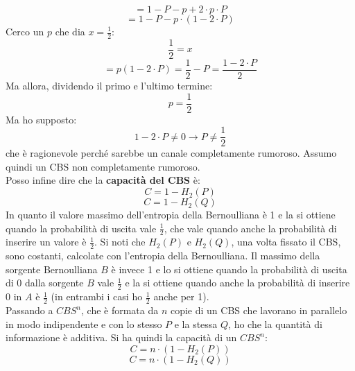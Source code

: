 \documentclass[a4paper,12pt, oneside]{book}
\begin{document}
\[=1-P-p+2\cdot p\cdot P\]
\[=1-P-p\cdot (1-2\cdot P)\]
Cerco un $p$ che dia $x=\frac{1}{2}$:
\[\frac{1}{2}=x\]
\[=p(1-2\cdot P)=\frac{1}{2}-P=\frac{1-2\cdot P}{2}\]
Ma allora, dividendo il primo e l'ultimo termine:
\[p=\frac{1}{2}\]
Ma ho supposto:
\[1-2\cdot P\neq 0\to P\neq \frac{1}{2}\]
che è ragionevole perché sarebbe un canale completamente rumoroso. Assumo quindi
un CBS non completamente rumoroso.\\
Posso infine dire che la \textbf{capacità del CBS} è:
\[C=1-H_2(P)\]
\[C=1-H_2(Q)\]
In quanto il valore massimo dell'entropia della Bernoulliana è 1 e la si ottiene
quando la probabilità di uscita vale $\frac{1}{2}$, che vale quando anche la
probabilità di inserire un valore è $\frac{1}{2}$. Si noti che $H_2(P)$ e
$H_2(Q)$, una volta fissato il CBS, sono costanti, calcolate con l'entropia
della Bernoulliana. Il massimo della sorgente Bernoulliana $B$ è invece 1 e lo
si ottiene quando la probabilità di uscita di 0 dalla sorgente $B$ vale
$\frac{1}{2}$ e la si ottiene quando anche la probabilità di inserire 0 in $A$ è
$\frac{1}{2}$ (in entrambi i casi ho $\frac{1}{2}$ anche per 1). \\
Passando a $CBS^n$, che è formata da $n$ copie di un CBS che lavorano in
parallelo in modo indipendente e con lo stesso $P$ e la stessa $Q$, ho che
la quantità di informazione è additiva. Si ha quindi la capacità di un $CBS^n$:
\[C=n\cdot \left(1-H_2(P)\right)\]
\[C=n\cdot \left(1-H_2(Q)\right)\]
\end{document}
